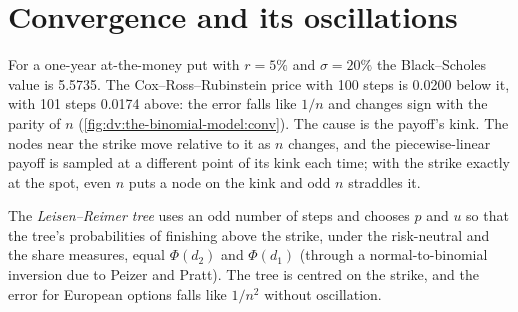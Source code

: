 \begin{omfigure}

\label{fig:dv:the-binomial-model:terminal}
\end{omfigure}

\section{Convergence and its oscillations}

For a one-year at-the-money put with $r=5\%$ and $\sigma=20\%$ the Black--Scholes
value is 5.5735. The Cox--Ross--Rubinstein price with 100 steps is 0.0200 below
it, with 101 steps 0.0174 above: the error falls like $1/n$ and changes sign
with the parity of $n$ (\cref{fig:dv:the-binomial-model:conv}). The cause is the
payoff's kink. The nodes near the strike move relative to it as $n$ changes,
and the piecewise-linear payoff is sampled at a different point of its kink
each time; with the strike exactly at the spot, even $n$ puts a node on the kink
and odd $n$ straddles it.

\begin{definition}\label{def:dv:the-binomial-model:lr}
The \emph{Leisen--Reimer tree} uses an odd number of
steps and chooses $p$ and $u$ so that the tree's probabilities of finishing above
the strike, under the risk-neutral and the share measures, equal $\Phi(d_2)$ and
$\Phi(d_1)$ (through a normal-to-binomial inversion due to Peizer and Pratt).
The tree is centred on the strike, and the error for European options falls
like $1/n^2$ without oscillation.
\end{definition}


